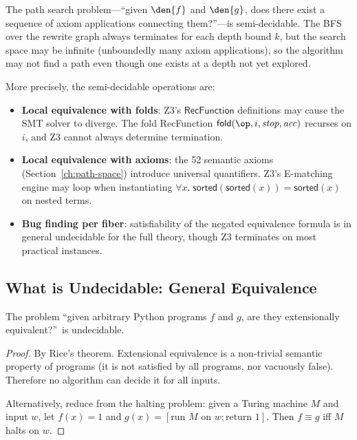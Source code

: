 \begin{proposition}
\label{prop:path-semi}
The path search problem---``given $\den{f}$ and $\den{g}$, does
there exist a sequence of axiom applications connecting them?''---is
semi-decidable.  The BFS over the rewrite graph always terminates for
each depth bound $k$, but the search space may be infinite
(unboundedly many axiom applications), so the algorithm may not find
a path even though one exists at a depth not yet explored.
\end{proposition}

More precisely, the semi-decidable operations are:
\begin{itemize}
  \item \textbf{Local equivalence with folds}: Z3's
    $\mathsf{RecFunction}$ definitions may cause the SMT solver to
    diverge.  The fold RecFunction
    $\mathsf{fold}(\op, i, \mathit{stop}, \mathit{acc})$ recurses on
    $i$, and Z3 cannot always determine termination.
  \item \textbf{Local equivalence with axioms}: the 52 semantic axioms
    (Section~\ref{ch:path-space}) introduce universal quantifiers.
    Z3's E-matching engine may loop when instantiating
    $\forall x.\; \mathsf{sorted}(\mathsf{sorted}(x)) = \mathsf{sorted}(x)$
    on nested terms.
  \item \textbf{Bug finding per fiber}: satisfiability of the negated
    equivalence formula is in general undecidable for the full theory,
    though Z3 terminates on most practical instances.
\end{itemize}

\subsection{What is Undecidable: General Equivalence}

\begin{theorem}
\label{thm:undecidable-equiv}
The problem ``given arbitrary Python programs $f$ and $g$, are they
extensionally equivalent?''\ is undecidable.
\end{theorem}

\begin{proof}
By Rice's theorem.  Extensional equivalence is a non-trivial semantic
property of programs (it is not satisfied by all programs, nor
vacuously false).  Therefore no algorithm can decide it for all inputs.

Alternatively, reduce from the halting problem: given a Turing machine
$M$ and input $w$, let $f(x) = 1$ and $g(x) = [\text{run } M
\text{ on } w; \text{return } 1]$.  Then $f \equiv g$ iff $M$ halts
on $w$.
\end{proof}

